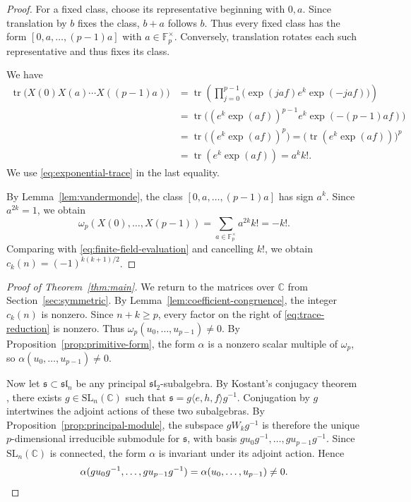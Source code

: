 \documentclass[12pt]{article}
\theoremstyle{definition}
\theoremstyle{remark}
\DeclareMathOperator{\tr}{tr}
\newcommand{\C}{\mathbb C}
\newcommand{\Fp}{\mathbb F_p}
\begin{document}
\begin{proof}
For a fixed class, choose its representative beginning with $0,a$.
Since translation by $b$ fixes the class, $b+a$ follows $b$.
Thus every fixed class has the form $[0,a,\ldots,(p-1)a]$ with
$a\in\Fp^\times$.
Conversely, translation rotates each such representative and thus fixes
its class.

We have
\begin{align*}
 \tr\bigl(X(0)X(a)\cdots X((p-1)a)\bigr)
 &=\tr\!\left(\prod_{j=0}^{p-1}
   \bigl(\exp(jaf)e^k\exp(-jaf)\bigr)\right)\\
 &=\tr\bigl((e^k\exp(af))^{p-1}e^k\exp(-(p-1)af)\bigr)\\
 &=\tr\bigl((e^k\exp(af))^p\bigr)
 =\bigl(\tr(e^k\exp(af))\bigr)^p\\
 &=\tr(e^k\exp(af))=a^k k!.
\end{align*}
We use \eqref{eq:exponential-trace} in the last equality.

By Lemma~\ref{lem:vandermonde}, the class $[0,a,\ldots,(p-1)a]$ has
sign $a^k$. Since $a^{2k}=1$, we obtain
\[
 \omega_p(X(0),\ldots,X(p-1))
 =\sum_{a\in\Fp^\times}a^{2k}k!=-k!.
\]
Comparing with \eqref{eq:finite-field-evaluation} and cancelling $k!$,
we obtain $c_k(n)=(-1)^{k(k+1)/2}$.
\end{proof}

\begin{proof}[Proof of Theorem~\ref{thm:main}]
We return to the matrices over $\C$ from Section~\ref{sec:symmetric}.
By Lemma~\ref{lem:coefficient-congruence}, the integer $c_k(n)$ is nonzero.
Since $n+k\geq p$, every factor on the right of
\eqref{eq:trace-reduction} is nonzero.
Thus $\omega_p(u_0,\ldots,u_{p-1})\neq0$.
By Proposition~\ref{prop:primitive-form}, the form $\alpha$ is a nonzero
scalar multiple of $\omega_p$, so $\alpha(u_0,\ldots,u_{p-1})\neq0$.

Now let $\mathfrak s\subset\mathfrak{sl}_n$ be any principal
$\mathfrak{sl}_2$-subalgebra. By Kostant's conjugacy theorem
\cite[Corollary 3.7]{Kostant1959}, there exists $g\in\mathrm{SL}_n(\C)$
such that $\mathfrak s=g\langle e,h,f\rangle g^{-1}$.
Conjugation by $g$ intertwines the adjoint actions of these two
subalgebras. By Proposition~\ref{prop:principal-module}, the subspace
$gW_kg^{-1}$ is therefore the unique $p$-dimensional irreducible
submodule for $\mathfrak s$, with basis
$gu_0g^{-1},\ldots,gu_{p-1}g^{-1}$.
Since $\mathrm{SL}_n(\C)$ is connected, the form $\alpha$ is invariant
under its adjoint action. Hence
\[
 \alpha(gu_0g^{-1},\ldots,gu_{p-1}g^{-1})
 =\alpha(u_0,\ldots,u_{p-1})\neq0.\qedhere
\]
\end{proof}
\end{document}
